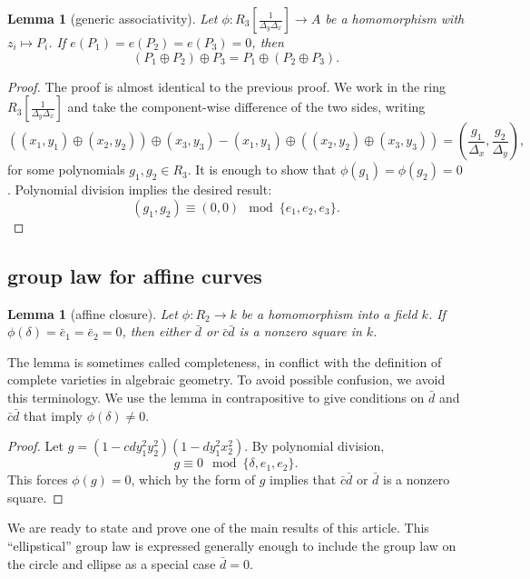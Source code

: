 \documentclass[12pt]{article}
\newtheorem{lemma}[theorem]{Lemma}
\newcommand{\f}[1]{\frac{1}{#1}}
\def\cong{\equiv}
\begin{document}
\begin{lemma}[generic associativity] \label{lemma:assoc} Let
  $\phi:R_3[\f{\Delta_y\Delta_x}]\to A$ be a homomorphism with $z_i\mapsto P_i$.
  If $e(P_1)=e(P_2)=e(P_3)=0$, then
\[
(P_1 \oplus P_2)\oplus P_3 = 
P_1 \oplus (P_2\oplus P_3).
\]
\end{lemma}

\begin{proof} The proof is almost identical to the previous proof.  We
  work in the ring $R_3[\f{\Delta_y\Delta_x}]$ and take the
  component-wise difference of the two sides, writing
\[
((x_1,y_1)\oplus (x_2,y_2)) \oplus (x_3,y_3)-
(x_1,y_1)\oplus ((x_2,y_2) \oplus (x_3,y_3)) 
= (\frac{g_1}{\Delta_x},\frac{g_2}{\Delta_y}),
\]
for some polynomials $g_1,g_2 \in R_3$.  
It is enough to show that $\phi(g_1)=\phi(g_2)=0$. 
Polynomial division implies the desired result:
\[
(g_1,g_2)\cong (0,0) \mod \{e_1,e_2,e_3\}.
\]
\end{proof}

\subsection{group law for affine curves}

\begin{lemma}[affine closure] \label{lemma:affine} Let $\phi:R_2\to k$
  be a homomorphism into a field $k$.  If $\phi(\delta)=\bar e_1=\bar
  e_2=0$, then either $\bar d$ or $\bar c \bar d$ is a nonzero square
  in $k$.
\end{lemma}

The lemma is sometimes called completeness, in conflict with the
definition of complete varieties in algebraic geometry.  To avoid
possible confusion, we avoid this terminology.  We use the lemma in
contrapositive to give conditions on $\bar d$ and $\bar c\bar d$ that
imply $\phi(\delta)\ne0$.

\begin{proof} 
  Let $g = (1 - c d y_1^2 y_2 ^2) (1 - d y_1^2 x_2^2)$.  By polynomial
  division,
\begin{equation}\label{eqn:squares}
  g \cong 0 \mod \{\delta,e_1,e_2\}.
\end{equation}
This forces $\phi(g)=0$, which by the form of $g$ implies that $\bar
c\bar d$ or $\bar d$ is a nonzero square.
\end{proof}

We are ready to state and prove one of the main results of this
article.  This ``ellipstical'' group law is expressed generally enough
to include the group law on the circle and ellipse as a special case 
$\bar d = 0$.
\end{document}
